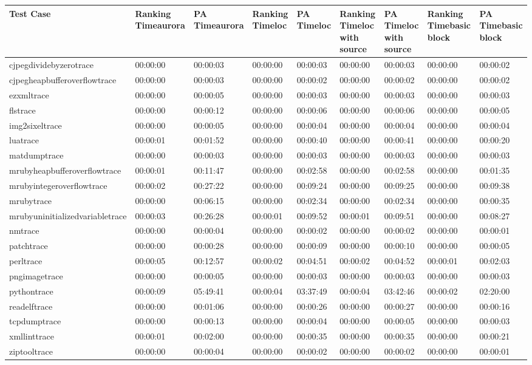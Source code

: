 \begin{tabular}{lllllllll}
\toprule
Test Case & Ranking Timeaurora & PA Timeaurora & Ranking Timeloc & PA Timeloc & Ranking Timeloc with source & PA Timeloc with source & Ranking Timebasic block & PA Timebasic block \\
\midrule
cjpegdividebyzerotrace & 00:00:00 & 00:00:03 & 00:00:00 & 00:00:03 & 00:00:00 & 00:00:03 & 00:00:00 & 00:00:02 \\
cjpegheapbufferoverflowtrace & 00:00:00 & 00:00:03 & 00:00:00 & 00:00:02 & 00:00:00 & 00:00:02 & 00:00:00 & 00:00:02 \\
ezxmltrace & 00:00:00 & 00:00:05 & 00:00:00 & 00:00:03 & 00:00:00 & 00:00:03 & 00:00:00 & 00:00:03 \\
flstrace & 00:00:00 & 00:00:12 & 00:00:00 & 00:00:06 & 00:00:00 & 00:00:06 & 00:00:00 & 00:00:05 \\
img2sixeltrace & 00:00:00 & 00:00:05 & 00:00:00 & 00:00:04 & 00:00:00 & 00:00:04 & 00:00:00 & 00:00:04 \\
luatrace & 00:00:01 & 00:01:52 & 00:00:00 & 00:00:40 & 00:00:00 & 00:00:41 & 00:00:00 & 00:00:20 \\
matdumptrace & 00:00:00 & 00:00:03 & 00:00:00 & 00:00:03 & 00:00:00 & 00:00:03 & 00:00:00 & 00:00:03 \\
mrubyheapbufferoverflowtrace & 00:00:01 & 00:11:47 & 00:00:00 & 00:02:58 & 00:00:00 & 00:02:58 & 00:00:00 & 00:01:35 \\
mrubyintegeroverflowtrace & 00:00:02 & 00:27:22 & 00:00:00 & 00:09:24 & 00:00:00 & 00:09:25 & 00:00:00 & 00:09:38 \\
mrubytrace & 00:00:00 & 00:06:15 & 00:00:00 & 00:02:34 & 00:00:00 & 00:02:34 & 00:00:00 & 00:00:35 \\
mrubyuninitializedvariabletrace & 00:00:03 & 00:26:28 & 00:00:01 & 00:09:52 & 00:00:01 & 00:09:51 & 00:00:00 & 00:08:27 \\
nmtrace & 00:00:00 & 00:00:04 & 00:00:00 & 00:00:02 & 00:00:00 & 00:00:02 & 00:00:00 & 00:00:01 \\
patchtrace & 00:00:00 & 00:00:28 & 00:00:00 & 00:00:09 & 00:00:00 & 00:00:10 & 00:00:00 & 00:00:05 \\
perltrace & 00:00:05 & 00:12:57 & 00:00:02 & 00:04:51 & 00:00:02 & 00:04:52 & 00:00:01 & 00:02:03 \\
pngimagetrace & 00:00:00 & 00:00:05 & 00:00:00 & 00:00:03 & 00:00:00 & 00:00:03 & 00:00:00 & 00:00:03 \\
pythontrace & 00:00:09 & 05:49:41 & 00:00:04 & 03:37:49 & 00:00:04 & 03:42:46 & 00:00:02 & 02:20:00 \\
readelftrace & 00:00:00 & 00:01:06 & 00:00:00 & 00:00:26 & 00:00:00 & 00:00:27 & 00:00:00 & 00:00:16 \\
tcpdumptrace & 00:00:00 & 00:00:13 & 00:00:00 & 00:00:04 & 00:00:00 & 00:00:05 & 00:00:00 & 00:00:03 \\
xmllinttrace & 00:00:01 & 00:02:00 & 00:00:00 & 00:00:35 & 00:00:00 & 00:00:35 & 00:00:00 & 00:00:21 \\
ziptooltrace & 00:00:00 & 00:00:04 & 00:00:00 & 00:00:02 & 00:00:00 & 00:00:02 & 00:00:00 & 00:00:01 \\
\bottomrule
\end{tabular}
